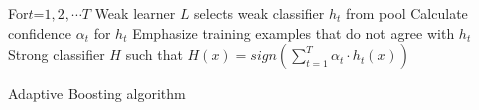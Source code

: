 \begin{algorithm}[H]
 \label{alg:adaboost}
For{$t$=$1,2,\cdots T$}{
	Weak learner $L$ selects weak classifier $h_t$ from pool\;
	Calculate confidence $\alpha_t$ for $h_t$\;
	Emphasize training examples that do not agree with $h_t$\;
}
\Return Strong classifier $H$ such that $H(x)=sign(\sum_{t=1}^{T}\alpha_t\cdot h_t(x))$
 \caption{Adaptive Boosting algorithm}
\end{algorithm}